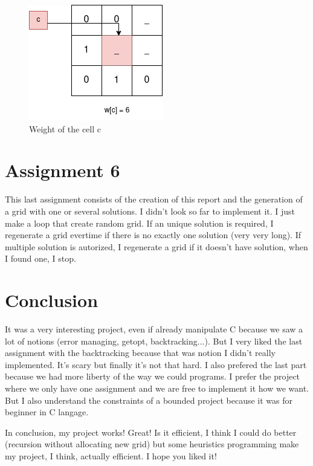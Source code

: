 \documentclass[a4paper,12pt]{article}
\begin{document}
\begin{figure}
    \centering
    \includegraphics[scale=0.75]{img/weight.drawio.png}
    \caption{Weight of the cell c}\label{wex}
\end{figure}



\section{Assignment 6}

This last assignment consists of the creation of this report and the generation of a grid with one or several solutions.
I didn't look so far to implement it. I just make a loop that create random grid. If an unique solution is required, I regenerate a grid evertime if there is no exactly one solution (very very long). If multiple solution is autorized, I regenerate a grid if it doesn't have solution, when I found one, I stop.

\section{Conclusion}

It was a very interesting project, even if already manipulate C because we saw a lot of notions (error managing, getopt, backtracking...).
 But I very liked the last assignment with the backtracking because that was notion I didn't really implemented. It's scary but finally it's not that hard.
I also prefered the last part because we had more liberty of the way we could programs. I prefer the project where we only have one assignment and we are free
to implement it how we want. But I also understand the constraints of a bounded project because it was for beginner in C langage.

In conclusion, my project works! Great! Is it efficient, I think I could do better (recursion without allocating new grid) but some heuristics programming make my project, I think, actually efficient.
I hope you liked it!
\end{document}
